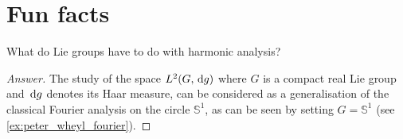\documentclass{report}
\begin{document}
\chapter{Fun facts}

\begin{question}
    What do Lie groups have to do with harmonic analysis?
\end{question}
\begin{proof}[Answer]
    The study of the space $L^2(G, \,\mathrm{d} g)$ where $G$ is a compact real Lie group and $\,\mathrm{d} g$ denotes its Haar measure, can be considered as a generalisation of the classical Fourier analysis on the circle $\mathbb S^1$, as can be seen by setting $G = \mathbb S^1$ (see \cref{ex:peter_wheyl_fourier}).
\end{proof}


\printbibliography
\end{document}
